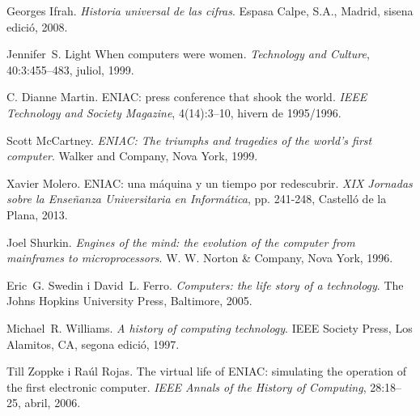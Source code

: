\documentclass[11pt,catalan,
               listoftables,listoffigures,listofalgorithms,listofquadres]
               {tfgetsinf}
\begin{document}
\begin{thebibliography}{10}
Georges Ifrah.
\newblock \textit{Historia universal de las cifras}.
\newblock Espasa Calpe, S.A., Madrid, sisena edició, 2008.

Jennifer~S. Light
\newblock When computers were women.
\newblock \textit{Technology and Culture}, 40:3:455--483, juliol, 1999.

C. Dianne Martin.
\newblock ENIAC: press conference that shook the world.
\newblock \textit{IEEE Technology and Society Magazine}, 4(14):3--10, hivern de 1995/1996.

Scott McCartney.
\newblock \textit{ENIAC: The triumphs and tragedies of the world's first computer}.
\newblock Walker and Company, Nova York, 1999.

Xavier Molero.
\newblock ENIAC: una máquina y un tiempo por redescubrir.
\newblock \textit{XIX Jornadas sobre la Enseñanza Universitaria en Informática}, pp. 241-248, Castelló de la Plana, 2013.

Joel Shurkin.
\newblock \textit{Engines of the mind: the evolution of the computer from mainframes to microprocessors}.
\newblock W. W. Norton \& Company, Nova York, 1996.

Eric~G. Swedin i David~L. Ferro.
\newblock \textit{Computers: the life story of a technology}.
\newblock The Johns Hopkins University Press, Baltimore, 2005.

Michael~R. Williams.
\newblock \textit{A history of computing technology}.
\newblock IEEE Society Press, Los Alamitos, CA, segona edició, 1997.

Till Zoppke i Raúl Rojas.
\newblock The virtual life of ENIAC: simulating the operation of the first electronic computer.
\newblock \textit{IEEE Annals of the History of Computing}, 28:18--25, abril, 2006.

\end{thebibliography}
\cleardoublepage


\APPENDIX 

\end{document}
